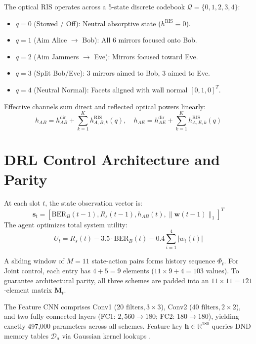 \documentclass[journal,10pt,twocolumn]{IEEEtran}
\begin{document}
The optical RIS operates across a 5-state discrete codebook $\mathcal{Q} = \{0, 1, 2, 3, 4\}$:
\begin{itemize}
    \item $q = 0$ (Stowed / Off): Neutral absorptive state ($h^{\text{RIS}} \equiv 0$).
    \item $q = 1$ (Aim Alice $\to$ Bob): All 6 mirrors focused onto Bob.
    \item $q = 2$ (Aim Jammers $\to$ Eve): Mirrors focused toward Eve.
    \item $q = 3$ (Split Bob/Eve): 3 mirrors aimed to Bob, 3 aimed to Eve.
    \item $q = 4$ (Neutral Normal): Facets aligned with wall normal $[0, 1, 0]^T$.
\end{itemize}

Effective channels sum direct and reflected optical powers linearly:
\begin{equation}
h_{AB} = h_{AB}^{\text{dir}} + \sum_{k=1}^K h_{A,B,k}^{\text{RIS}}(q), \quad h_{AE} = h_{AE}^{\text{dir}} + \sum_{k=1}^K h_{A,E,k}^{\text{RIS}}(q)
\end{equation}

\section{DRL Control Architecture and Parity}
At each slot $t$, the state observation vector is:
\begin{equation}
\mathbf{s}_t = [\text{BER}_B(t-1), R_s(t-1), h_{AB}(t), \|\mathbf{w}(t-1)\|_1]^T
\end{equation}
The agent optimizes total system utility:
\begin{equation}
U_t = R_s(t) - 3.5 \cdot \text{BER}_B(t) - 0.4 \sum_{i=1}^4 |w_i(t)|
\end{equation}

A sliding window of $M = 11$ state-action pairs forms history sequence $\Phi_t$. For Joint control, each entry has $4 + 5 = 9$ elements ($11 \times 9 + 4 = 103$ values). To guarantee architectural parity, all three schemes are padded into an $11 \times 11 = 121$-element matrix $\mathbf{M}_t$.

The Feature CNN comprises Conv1 ($20 \text{ filters}, 3 \times 3$), Conv2 ($40 \text{ filters}, 2 \times 2$), and two fully connected layers (FC1: $2,560 \to 180$; FC2: $180 \to 180$), yielding exactly 497,000 parameters across all schemes. Feature key $\mathbf{h} \in \mathbb{R}^{180}$ queries DND memory tables $\mathcal{D}_a$ via Gaussian kernel lookups \cite{pritchard2017neural}.
\end{document}
